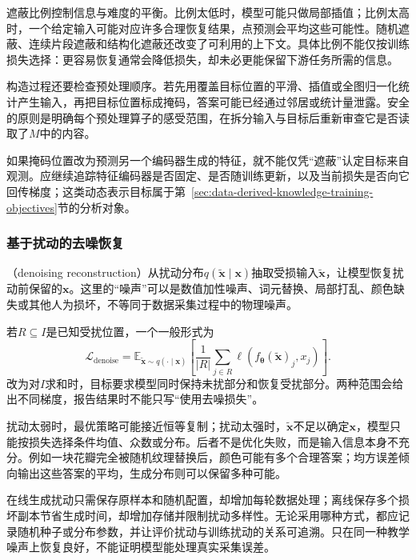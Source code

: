 遮蔽比例控制信息与难度的平衡。比例太低时，模型可能只做局部插值；比例太高时，一个给定输入可能对应许多合理恢复结果，点预测会平均这些可能性。随机遮蔽、连续片段遮蔽和结构化遮蔽还改变了可利用的上下文。具体比例不能仅按训练损失选择：更容易恢复通常会降低损失，却未必更能保留下游任务所需的信息。

构造过程还要检查预处理顺序。若先用覆盖目标位置的平滑、插值或全图归一化统计产生输入，再把目标位置标成掩码，答案可能已经通过邻居或统计量泄露。安全的原则是明确每个预处理算子的感受范围，在拆分输入与目标后重新审查它是否读取了$M$中的内容。

如果掩码位置改为预测另一个编码器生成的特征，就不能仅凭“遮蔽”认定目标来自观测。应继续追踪特征编码器是否固定、是否随训练更新，以及当前损失是否向它回传梯度；这类动态表示目标属于第~\ref{sec:data-derived-knowledge-training-objectives}节的分析对象。

\subsubsection{基于扰动的去噪恢复}
\label{sec:data-derived-knowledge-denoising-recovery}

（denoising reconstruction）从扰动分布$q(\widetilde{\bm{x}}\mid\bm{x})$抽取受损输入$\widetilde{\bm{x}}$，让模型恢复扰动前保留的$\bm{x}$。这里的“噪声”可以是数值加性噪声、词元替换、局部打乱、颜色缺失或其他人为损坏，不等同于数据采集过程中的物理噪声。

若$R\subseteq I$是已知受扰位置，一个一般形式为
\begin{equation}
  \mathcal{L}_{\mathrm{denoise}}
  =\mathbb{E}_{\widetilde{\bm{x}}\sim q(\cdot\mid\bm{x})}
   \left[\frac{1}{|R|}\sum_{j\in R}\ell\!\left(f_{\bm{\theta}}(\widetilde{\bm{x}})_j,x_j\right)\right].
  \label{eq:data-derived-knowledge-denoising}
\end{equation}
改为对$I$求和时，目标要求模型同时保持未扰部分和恢复受扰部分。两种范围会给出不同梯度，报告结果时不能只写“使用去噪损失”。

扰动太弱时，最优策略可能接近恒等复制；扰动太强时，$\widetilde{\bm{x}}$不足以确定$\bm{x}$，模型只能按损失选择条件均值、众数或分布。后者不是优化失败，而是输入信息本身不充分。例如一块花瓣完全被随机纹理替换后，颜色可能有多个合理答案；均方误差倾向输出这些答案的平均，生成分布则可以保留多种可能。

在线生成扰动只需保存原样本和随机配置，却增加每轮数据处理；离线保存多个损坏副本节省生成时间，却增加存储并限制扰动多样性。无论采用哪种方式，都应记录随机种子或分布参数，并让评价扰动与训练扰动的关系可追溯。只在同一种教学噪声上恢复良好，不能证明模型能处理真实采集误差。

